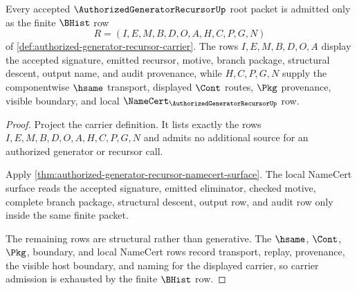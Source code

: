 \begin{theorem}
\label{thm:authorized-generator-recursor-carrier-admission}
Every accepted $\AuthorizedGeneratorRecursorUp$ root packet is admitted only as the finite $\BHist$ row
$$
R=(I,E,M,B,D,O,A,H,C,P,G,N)
$$
of \autoref{def:authorized-generator-recursor-carrier}. The rows $I,E,M,B,D,O,A$ display the accepted signature, emitted recursor, motive, branch package, structural descent, output name, and audit provenance, while $H,C,P,G,N$ supply the componentwise $\hsame$ transport, displayed $\Cont$ routes, $\Pkg$ provenance, visible boundary, and local $\NameCert_{\AuthorizedGeneratorRecursorUp}$ row.
\end{theorem}
\begin{proof}
Project the carrier definition. It lists exactly the rows $I,E,M,B,D,O,A,H,C,P,G,N$ and admits no additional source for an authorized generator or recursor call.

Apply \autoref{thm:authorized-generator-recursor-namecert-surface}. The local NameCert surface reads the accepted signature, emitted eliminator, checked motive, complete branch package, structural descent, output row, and audit row only inside the same finite packet.

The remaining rows are structural rather than generative. The $\hsame$, $\Cont$, $\Pkg$, boundary, and local NameCert rows record transport, replay, provenance, the visible host boundary, and naming for the displayed carrier, so carrier admission is exhausted by the finite $\BHist$ row.
\end{proof}

